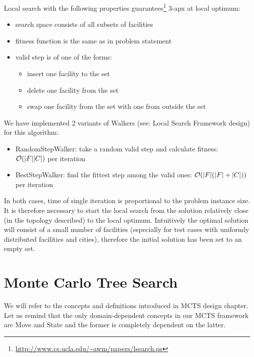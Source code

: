 Local search with the following properties
guarantees\footnote{\url{http://www.cs.ucla.edu/~awm/papers/lsearch.ps}}
3-apx at local optimum:
\begin{itemize}
\item search space consists of all subsets of facilities
\item fitness function is the same as in problem statement
\item valid step is of one of the forms:
	\begin{itemize}
	\item insert one facility to the set
	\item delete one facility from the set
	\item swap one facility from the set with one from outside the set
	\end{itemize}
\end{itemize}

We have implemented 2 variants of Walkers (see: Local Search Framework design)
for this algorithm:
\begin{itemize}
\item RandomStepWalker: take a random valid step and calculate fitness: $\mathcal{O}(|F||C|)$ per iteration
\item BestStepWalker: find the fittest step among the valid ones: $\mathcal{O}(|F|(|F|+|C|))$ per iteration
\end{itemize}

In both cases, time of single iteration is proportional to the problem
instance size. It is therefore necessary to start the local search from
the solution relatively close (in the topology described) to the local
optimum. Intuitively the optimal solution will consist of a small number
of facilities (especially for test cases with uniformly distributed facilities and cities),
therefore the initial solution has been set to an empty set.

\section{\label{MCTS_FL}Monte Carlo Tree Search}

We will refer to the concepts and definitions introduced in MCTS design
chapter. Let us remind that the only domain-dependent concepts in our MCTS
framework are Move and State and the former is completely dependent on the
latter.

